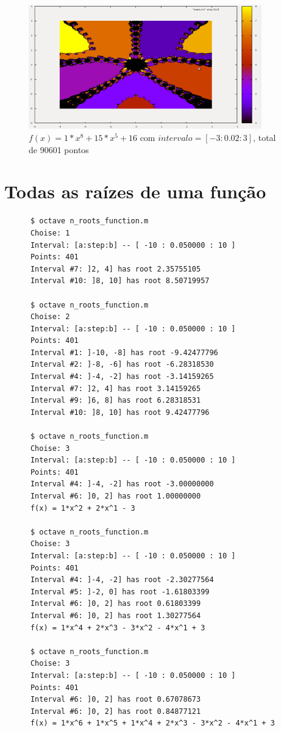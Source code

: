   \begin{figure}[htp]
    \centering
    \includegraphics[width=0.9\textwidth]{imgs/img6.png}
    \caption{$f(x) = 1*x^8 + 15*x^5 + 16$ com $intervalo = [-3: 0.02: 3]$, total de 90601  pontos}
  \end{figure}

  \section{Todas as raízes de uma função}\label{section:allRoots}
    
    \begin{verbatim}
      $ octave n_roots_function.m
      Choise: 1
      Interval: [a:step:b] -- [ -10 : 0.050000 : 10 ]
      Points: 401
      Interval #7: ]2, 4] has root 2.35755105
      Interval #10: ]8, 10] has root 8.50719957

      $ octave n_roots_function.m
      Choise: 2
      Interval: [a:step:b] -- [ -10 : 0.050000 : 10 ]
      Points: 401
      Interval #1: ]-10, -8] has root -9.42477796
      Interval #2: ]-8, -6] has root -6.28318530
      Interval #4: ]-4, -2] has root -3.14159265
      Interval #7: ]2, 4] has root 3.14159265
      Interval #9: ]6, 8] has root 6.28318531
      Interval #10: ]8, 10] has root 9.42477796

      $ octave n_roots_function.m
      Choise: 3
      Interval: [a:step:b] -- [ -10 : 0.050000 : 10 ]
      Points: 401
      Interval #4: ]-4, -2] has root -3.00000000
      Interval #6: ]0, 2] has root 1.00000000
      f(x) = 1*x^2 + 2*x^1 - 3

      $ octave n_roots_function.m
      Choise: 3
      Interval: [a:step:b] -- [ -10 : 0.050000 : 10 ]
      Points: 401
      Interval #4: ]-4, -2] has root -2.30277564
      Interval #5: ]-2, 0] has root -1.61803399
      Interval #6: ]0, 2] has root 0.61803399
      Interval #6: ]0, 2] has root 1.30277564
      f(x) = 1*x^4 + 2*x^3 - 3*x^2 - 4*x^1 + 3

      $ octave n_roots_function.m
      Choise: 3
      Interval: [a:step:b] -- [ -10 : 0.050000 : 10 ]
      Points: 401
      Interval #6: ]0, 2] has root 0.67078673
      Interval #6: ]0, 2] has root 0.84877121
      f(x) = 1*x^6 + 1*x^5 + 1*x^4 + 2*x^3 - 3*x^2 - 4*x^1 + 3
    \end{verbatim}
